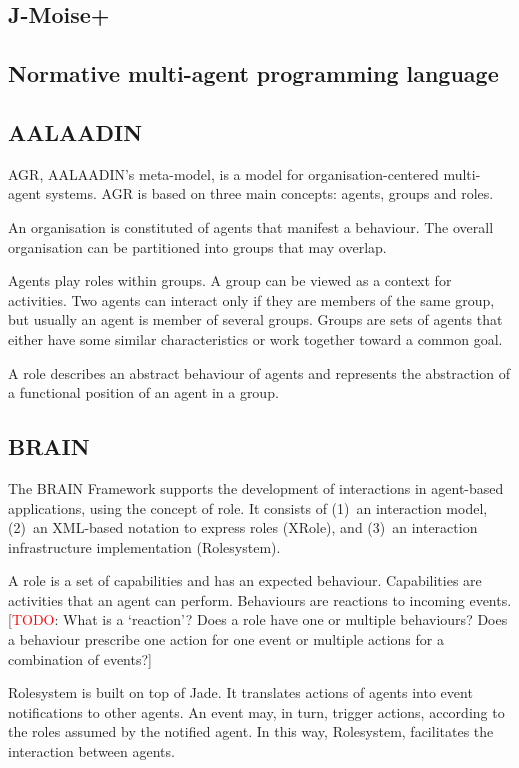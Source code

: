 \documentclass{article}
\newcommand{\todo}[1]{[\textcolor{red}{TODO}: #1]}
\begin{document}
\subsection{J-Moise+}
\subsection{Normative multi-agent programming language}

\subsection{AALAADIN} 
\label{sec:aalaadin}

AGR, AALAADIN's meta-model, is a model for organisation-centered
multi-agent systems. AGR is based on three main concepts: agents,
groups and roles.

An organisation is constituted of agents that manifest a behaviour.
The overall organisation can be partitioned into groups that may
overlap. 

Agents play roles within groups. A group can be viewed as a
context for activities. Two agents can interact only if they are
members of the same group, but usually an agent is member of
several groups. Groups are sets of agents that either have some
similar characteristics or work together toward a common goal.

A role describes an abstract behaviour of agents and represents the
abstraction of a functional position of an agent in a group.

\subsection{BRAIN} 

The BRAIN Framework supports the development of interactions
in agent-based applications, using the concept of role. It
consists of (1)~an interaction model, (2)~an XML-based notation
to express roles (XRole), and (3)~an interaction infrastructure
implementation (Rolesystem).

A role is a set of capabilities and has an expected behaviour.
Capabilities are activities that an agent can perform. Behaviours
are reactions to incoming events. \todo{What is a `reaction'?
Does a role have one or multiple behaviours? Does a behaviour
prescribe one action for one event or multiple actions for a
combination of events?}

Rolesystem is built on top of Jade. It translates actions of
agents into event notifications to other agents. An event may,
in turn, trigger actions, according to the roles assumed by
the notified agent. In this way, Rolesystem, facilitates the
interaction between agents.
\end{document}
